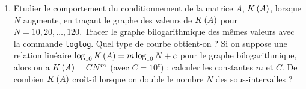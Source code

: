 \begin{enumerate}[label=\alph*)]
  \item Etudier le comportement du conditionnement de la matrice $A$, $K \left(A\right)$, lorsque $N$ augmente, en traçant le graphe des valeurs de $K \left(A\right)$ pour $N = 10, 20, \dots, 120$.
        Tracer le graphe bilogarithmique des mêmes valeurs avec la commande \texttt{loglog}.
        Quel type de courbe obtient-on ?
        Si on suppose une relation linéaire $\log_{10} K \left(A\right) = m \log_{10} N + c$ pour le graphe bilogarithmique, alors on a $K \left(A\right) = C N^{m}$ (avec $C = 10^{c}$) : calculer les constantes $m$ et $C$.
        De combien $K \left(A\right)$ croît-il lorsque on double le nombre $N$ des sous-intervalles ?
        
        
        
        
\end{enumerate}





